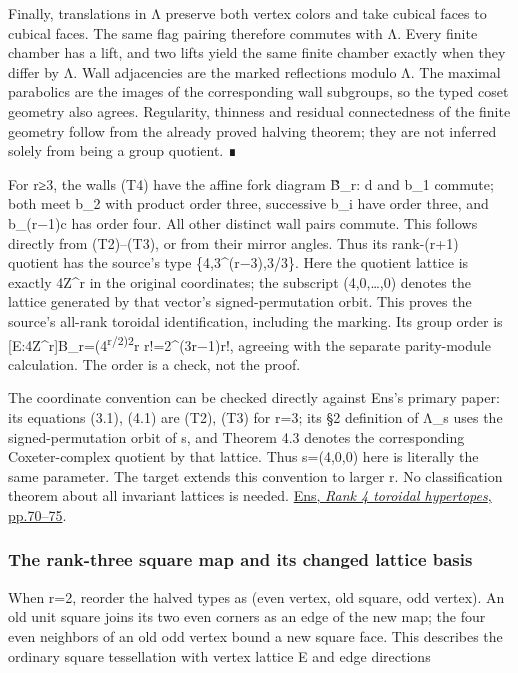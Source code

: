 \documentclass[
  10pt,
  letterpaper,
]{article}
\begin{document}
Finally, translations in Λ preserve both vertex colors and take cubical
faces to cubical faces. The same flag pairing therefore commutes with Λ.
Every finite chamber has a lift, and two lifts yield the same finite
chamber exactly when they differ by Λ. Wall adjacencies are the marked
reflections modulo Λ. The maximal parabolics are the images of the
corresponding wall subgroups, so the typed coset geometry also agrees.
Regularity, thinness and residual connectedness of the finite geometry
follow from the already proved halving theorem; they are not inferred
solely from being a group quotient. ∎

For r≥3, the walls (T4) have the affine fork diagram B̃\_r: d and b\_1
commute; both meet b\_2 with product order three, successive b\_i have
order three, and b\_(r−1)c has order four. All other distinct wall pairs
commute. This follows directly from (T2)--(T3), or from their mirror
angles. Thus its rank-(r+1) quotient has the source's type
\{4,3\^{}(r−3),3/3\}. Here the quotient lattice is exactly 4Z\^{}r in
the original coordinates; the subscript (4,0,\ldots,0) denotes the
lattice generated by that vector's signed-permutation orbit. This proves
the source's all-rank toroidal identification, including the marking.
Its group order is
{[}E:4Z\^{}r{]}\textbar B\_r\textbar=(4\textsuperscript{r/2)2}r
r!=2\^{}(3r−1)r!, agreeing with the separate parity-module calculation.
The order is a check, not the proof.

The coordinate convention can be checked directly against Ens's primary
paper: its equations (3.1), (4.1) are (T2), (T3) for r=3; its §2
definition of Λ\_s uses the signed-permutation orbit of s, and Theorem
4.3 denotes the corresponding Coxeter-complex quotient by that lattice.
Thus s=(4,0,0) here is literally the same parameter. The target extends
this convention to larger r. No classification theorem about all
invariant lattices is needed.
\href{https://www.researchgate.net/publication/325538081_Rank_4_toroidal_hypertopes}{Ens,
\emph{Rank 4 toroidal hypertopes}, pp.70--75}.

\subsubsection{The rank-three square map and its changed lattice
basis}\label{the-rank-three-square-map-and-its-changed-lattice-basis}

When r=2, reorder the halved types as (even vertex, old square, odd
vertex). An old unit square joins its two even corners as an edge of the
new map; the four even neighbors of an old odd vertex bound a new square
face. This describes the ordinary square tessellation with vertex
lattice E and edge directions
\end{document}
